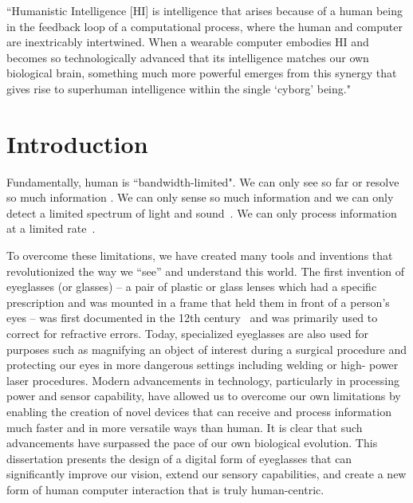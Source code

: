 \begin{savequote}[65mm]
``Humanistic Intelligence [HI] is intelligence that arises because of a human being in the feedback 
loop of a computational process, where the human and computer are inextricably intertwined. When a 
wearable computer embodies HI and becomes so technologically advanced that its intelligence 
matches our own biological brain, something much more powerful emerges from this synergy that 
gives rise to superhuman intelligence within the single `cyborg' being."
\end{savequote}

\chapter{Introduction}
Fundamentally, human is ``bandwidth-limited". We can only see so far or resolve so much information 
\cite{ophthalmology3rd}. We can only sense so much information 
and we can only detect a limited spectrum of light and sound~\cite{laming1986weber}. We can only process information at a limited rate~\cite{martin2009thermodynamics}.

To overcome these limitations, we have created many tools and 
inventions that revolutionized the way we ``see'' and understand this world. The first invention of 
eyeglasses (or glasses) -- a pair of plastic or glass lenses which had a specific prescription and was 
mounted in a frame that held them in front of a person's eyes -- was first documented in the 12th 
century~\cite{rosen1956invention} and was primarily used to correct for refractive errors. Today, 
specialized eyeglasses are also used for purposes such as magnifying an object of interest during a 
surgical procedure and protecting our eyes in more dangerous settings including welding or high-
power laser procedures. Modern advancements in technology, particularly in processing power and 
sensor capability, have allowed us to overcome our own limitations by enabling the creation of novel 
devices that can receive and process information much faster and in more versatile ways than human. 
It is clear that such advancements have surpassed the pace of our own biological evolution. This 
dissertation presents the design of a digital form of eyeglasses that can significantly improve our 
vision, extend our sensory capabilities, and create a new form of human computer interaction that is 
truly human-centric. 

